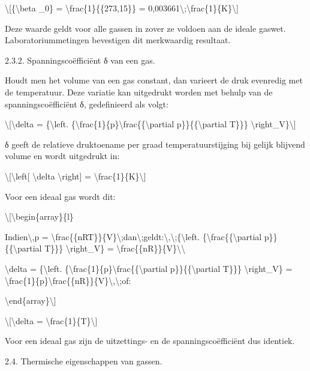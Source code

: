 \documentclass[]{article}
\begin{document}
\textbackslash{}{[}\{\textbackslash{}beta \_0\} =
\textbackslash{}frac\{1\}\{\{273,15\}\} =
0,003661\textbackslash{};\textbackslash{}frac\{1\}\{K\}\textbackslash{}{]}

Deze waarde geldt voor alle gassen in zover ze voldoen aan de ideale
gaswet. Laboratoriummetingen bevestigen dit merkwaardig resultaat.

2.3.2. Spanningscoëfficiënt δ van een gas.

Houdt men het volume van een gas constant, dan varieert de druk
evenredig met de temperatuur. Deze variatie kan uitgedrukt worden met
behulp van de spanningscoëfficiënt δ, gedefinieerd als volgt:

\textbackslash{}{[}\textbackslash{}delta = \{\textbackslash{}left.
\{\textbackslash{}frac\{1\}\{p\}\textbackslash{}frac\{\{\textbackslash{}partial
p\}\}\{\{\textbackslash{}partial T\}\}\}
\textbackslash{}right\textbar{}\_V\}\textbackslash{}{]}

δ geeft de relatieve druktoename per graad temperatuurstijging bij
gelijk blijvend volume en wordt uitgedrukt in:

\textbackslash{}{[}\textbackslash{}left{[} \textbackslash{}delta
\textbackslash{}right{]} =
\textbackslash{}frac\{1\}\{K\}\textbackslash{}{]}

Voor een ideaal gas wordt dit:

\textbackslash{}{[}\textbackslash{}begin\{array\}\{l\}

Indien\textbackslash{},p =
\textbackslash{}frac\{\{nRT\}\}\{V\}\textbackslash{};dan\textbackslash{};geldt:\textbackslash{},\textbackslash{};\{\textbackslash{}left.
\{\textbackslash{}frac\{\{\textbackslash{}partial
p\}\}\{\{\textbackslash{}partial T\}\}\}
\textbackslash{}right\textbar{}\_V\} =
\textbackslash{}frac\{\{nR\}\}\{V\}\textbackslash{}\textbackslash{}

\textbackslash{}delta = \{\textbackslash{}left.
\{\textbackslash{}frac\{1\}\{p\}\textbackslash{}frac\{\{\textbackslash{}partial
p\}\}\{\{\textbackslash{}partial T\}\}\}
\textbackslash{}right\textbar{}\_V\} =
\textbackslash{}frac\{1\}\{p\}\textbackslash{}frac\{\{nR\}\}\{V\}\textbackslash{},\textbackslash{};of:

\textbackslash{}end\{array\}\textbackslash{}{]}

\textbackslash{}{[}\textbackslash{}delta =
\textbackslash{}frac\{1\}\{T\}\textbackslash{}{]}

Voor een ideaal gas zijn de uitzettings- en de spanningscoëfficiënt dus
identiek.

2.4. Thermische eigenschappen van gassen.
\end{document}
